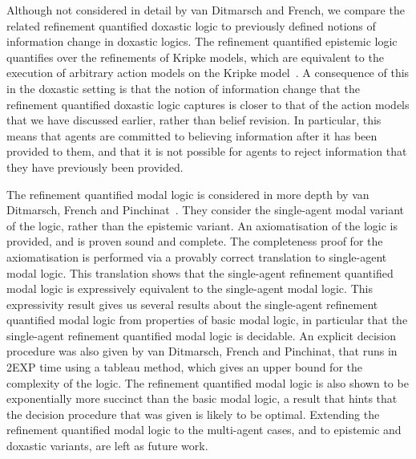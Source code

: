 Although not considered in detail by van Ditmarsch and French, we compare the
related refinement quantified doxastic logic to previously defined notions of
information change in doxastic logics. The refinement quantified epistemic logic
quantifies over the refinements of Kripke models, which are equivalent to the
execution of arbitrary action models on the Kripke
model~\cite{french2009simulation}. A consequence of this in the doxastic setting
is that the notion of information change that the refinement quantified doxastic
logic captures is closer to that of the action models that we have discussed
earlier, rather than belief revision. In particular, this means that agents are
committed to believing information after it has been provided to them, and that
it is not possible for agents to reject information that they have previously
been provided.

The refinement quantified modal logic is considered in more depth by van
Ditmarsch, French and Pinchinat~\cite{french2010future}. They consider the
single-agent modal variant of the logic, rather than the epistemic variant. An
axiomatisation of the logic is provided, and is proven sound and complete. The
completeness proof for the axiomatisation is performed via a provably correct
translation to single-agent modal logic. This translation shows that the
single-agent refinement quantified modal logic is expressively equivalent to the
single-agent modal logic. This expressivity result gives us several results
about the single-agent refinement quantified modal logic from properties of
basic modal logic, in particular that the single-agent refinement quantified
modal logic is decidable. An explicit decision procedure was also given by van
Ditmarsch, French and Pinchinat, that runs in 2EXP time using a tableau method,
which gives an upper bound for the complexity of the logic. The refinement
quantified modal logic is also shown to be exponentially more succinct than the
basic modal logic, a result that hints that the decision procedure that was
given is likely to be optimal. Extending the refinement quantified modal logic
to the multi-agent cases, and to epistemic and doxastic variants, are left as
future work.
